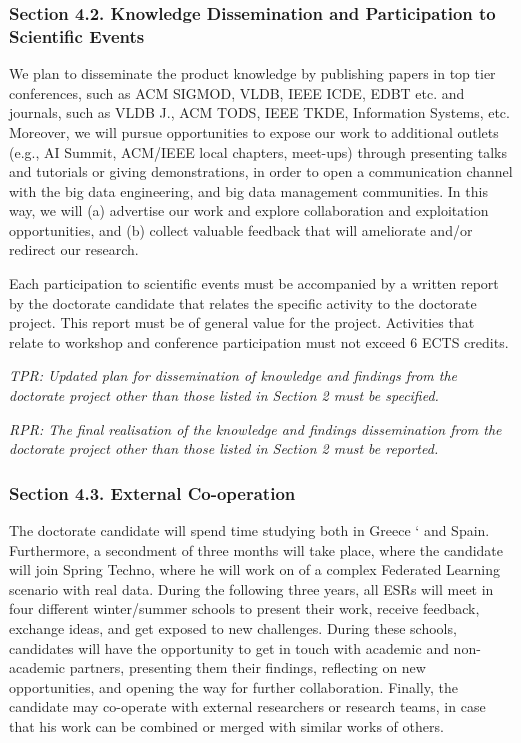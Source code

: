 \documentclass[12pt]{article}
\begin{document}
\subsubsection*{Section 4.2. Knowledge Dissemination and Participation to Scientific Events}

We plan to disseminate the product knowledge by publishing papers in top tier conferences, such as ACM
SIGMOD, VLDB, IEEE ICDE, EDBT etc. and journals, such as VLDB J., ACM TODS, IEEE TKDE,
Information Systems, etc. Moreover, we will pursue opportunities to expose our work to additional
outlets (e.g., AI Summit, ACM/IEEE local chapters, meet-ups) through presenting talks and tutorials or
giving demonstrations, in order to open a communication channel with the big data engineering,
and big data management communities. In this way, we will (a) advertise our work and explore collaboration
and exploitation opportunities, and (b) collect valuable feedback that will ameliorate and/or redirect our
research.



Each participation to scientific events must be accompanied by a written report by the doctorate candidate that relates the specific activity to the doctorate project. This report must be of general value for the project. Activities that relate to workshop and conference participation must not exceed 6 ECTS credits.

\begin{shaded}
\noindent
\emph{TPR: Updated plan for dissemination of knowledge and findings from the doctorate project other than those listed in Section 2 must be specified. }

\noindent
\emph{RPR: The final realisation of the knowledge and findings dissemination from the doctorate project other than those listed in Section 2 must be reported. }
\end{shaded}

\subsubsection*{Section 4.3. External Co-operation}
The doctorate candidate will spend time studying both in Greece `
and Spain. Furthermore, a secondment of three months will take place, where the candidate will join
Spring Techno, where he will work on of a complex Federated Learning scenario with real data.
During the following three years, all ESRs will meet in four different winter/summer schools to present their work, receive feedback, exchange ideas, and get exposed to new challenges. During these schools, candidates will have the opportunity to get in touch with academic and non-academic partners, presenting them their findings, reflecting on new opportunities, and opening the way for further collaboration. Finally, the candidate may co-operate with external researchers or research teams, in case that his work can be combined or merged with similar works of others.
\end{document}
